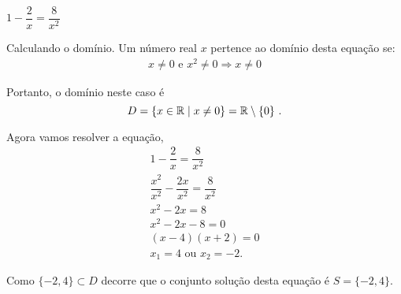  
 \begin{exem} $1 - \dfrac{2}{x}= \dfrac{8}{x^2}$
 
 Calculando o domínio. Um número real $x$ pertence ao domínio desta equação se:
 \begin{eqnarray*}
  x \neq 0 \text{ e } x^2 \neq 0 \Rightarrow x \neq 0
 \end{eqnarray*}
 
 Portanto, o domínio neste caso é
 \[D= \{ x \in \mathbb{R} \mid x \neq 0 \}= \mathbb{R} \setminus \{0\} \ . \]
 
 Agora vamos resolver a equação,
 \begin{eqnarray*}
 1 - \dfrac{2}{x}= \dfrac{8}{x^2} \\
 \dfrac{x^2}{x^2} - \dfrac{2x}{x^2}= \dfrac{8}{x^2} \\
 x^2 - 2x= 8 \\
 x^2 -2x -8= 0 \\
 (x-4)(x+2)= 0 \\
 x_1= 4 \text{ ou } x_2= -2.
 \end{eqnarray*}
 
 Como $\{-2, 4\} \subset D$ decorre que o conjunto solução desta equação é $S= \{ -2, 4 \}$.
 \end{exem}
 
 
 
 
 
 
